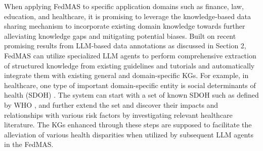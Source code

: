 When applying FedMAS to specific application domains such as finance, law, education, and healthcare, it is promising to leverage the knowledge-based data sharing mechanism to incorporate existing domain knowledge towards further alleviating knowledge gaps and mitigating potential biases. 
Built on recent promising results from LLM-based data annotations as discussed in Section 2, FedMAS can utilize specialized LLM agents to perform comprehensive extraction of structured knowledge from existing guidelines and tutorials and automatically integrate them with existing general and domain-specific KGs. For example, in healthcare, one type of important domain-specific entity is social determinants of health (SDOH) \cite{artiga2020disparities, artiga2018beyond, who2008closing}. The system can start with a set of known SDOH such as defined by WHO \cite{marmot2005social, phelan2010social}, and further extend the set and discover their impacts and relationships with various risk factors by investigating relevant healthcare literature. The KGs enhanced through these steps are supposed to facilitate the alleviation of various health disparities when utilized by subsequent LLM agents in the FedMAS. 

